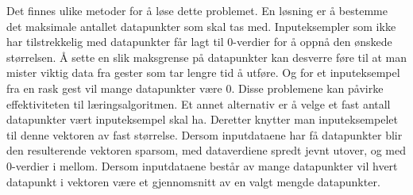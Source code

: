 Det finnes ulike metoder for å løse dette problemet. En løsning er å bestemme det maksimale antallet datapunkter som skal tas med. Inputeksempler som ikke har tilstrekkelig med datapunkter får lagt til 0-verdier for å oppnå den ønskede størrelsen. Å sette en slik maksgrense på datapunkter kan desverre føre til at man mister viktig data fra gester som tar lengre tid å utføre. Og for et inputeksempel fra en rask gest vil mange datapunkter være 0. Disse problemene kan påvirke effektiviteten til læringsalgoritmen. Et annet alternativ er å velge et fast antall datapunkter vært inputeksempel skal ha. Deretter knytter man inputeksempelet til denne vektoren av fast størrelse. Dersom inputdataene har få datapunkter blir den resulterende vektoren sparsom, med dataverdiene spredt jevnt utover, og med 0-verdier i mellom. Dersom inputdataene består av mange datapunkter vil hvert datapunkt i vektoren være et gjennomsnitt av en valgt mengde datapunkter.

